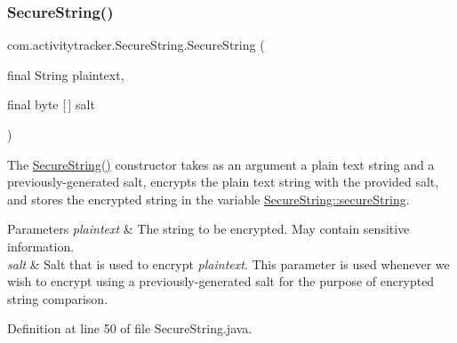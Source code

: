 \subsubsection{\texorpdfstring{SecureString()}{SecureString()}\hspace{0.1cm}{\footnotesize\ttfamily [2/2]}}
{\footnotesize\ttfamily com.\+activitytracker.\+Secure\+String.\+Secure\+String (\begin{DoxyParamCaption}\item[{final String}]{plaintext,  }\item[{final byte \mbox{[}$\,$\mbox{]}}]{salt }\end{DoxyParamCaption})\hspace{0.3cm}{\ttfamily [package]}}

The \mbox{\hyperlink{classcom_1_1activitytracker_1_1_secure_string_a889fcbf0c1f771962ac81886f49e389e}{Secure\+String()}} constructor takes as an argument a plain text string and a previously-\/generated salt, encrypts the plain text string with the provided salt, and stores the encrypted string in the variable \mbox{\hyperlink{classcom_1_1activitytracker_1_1_secure_string_a1448f7b8865c6c57cc7218662ee7f1ee}{Secure\+String\+::secure\+String}}.


\begin{DoxyParams}{Parameters}
{\em plaintext} & The string to be encrypted. May contain sensitive information. \\
\hline
{\em salt} & Salt that is used to encrypt {\itshape plaintext}. This parameter is used whenever we wish to encrypt using a previously-\/generated salt for the purpose of encrypted string comparison. \\
\hline
\end{DoxyParams}


Definition at line 50 of file Secure\+String.\+java.


\begin{DoxyCode}{0}

\end{DoxyCode}


